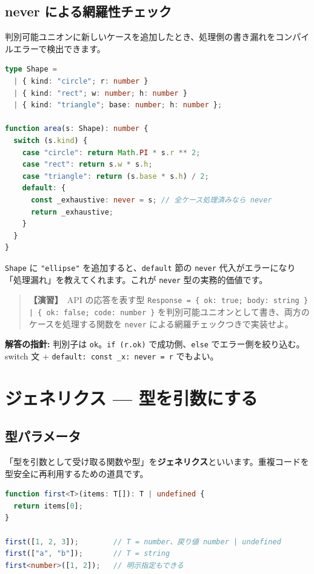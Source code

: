 \documentclass{article}
\begin{document}
\subsection{never による網羅性チェック}

判別可能ユニオンに新しいケースを追加したとき、処理側の書き漏れをコンパイルエラーで検出できます。

\begin{lstlisting}[language=TypeScript]
type Shape =
  | { kind: "circle"; r: number }
  | { kind: "rect"; w: number; h: number }
  | { kind: "triangle"; base: number; h: number };

function area(s: Shape): number {
  switch (s.kind) {
    case "circle": return Math.PI * s.r ** 2;
    case "rect": return s.w * s.h;
    case "triangle": return (s.base * s.h) / 2;
    default: {
      const _exhaustive: never = s; // 全ケース処理済みなら never
      return _exhaustive;
    }
  }
}
\end{lstlisting}

\texttt{Shape} に \texttt{"ellipse"} を追加すると、\texttt{default} 節の \texttt{never} 代入がエラーになり「処理漏れ」を教えてくれます。これが \texttt{never} 型の実務的価値です。

\begin{quote}
\textbf{【演習】}\ API の応答を表す型 \texttt{Response = \{ ok: true; body: string \} | \{ ok: false; code: number \}} を判別可能ユニオンとして書き、両方のケースを処理する関数を \texttt{never} による網羅チェックつきで実装せよ。
\end{quote}

\textbf{解答の指針:} 判別子は \texttt{ok}。\texttt{if (r.ok)} で成功側、\texttt{else} でエラー側を絞り込む。switch 文 + \texttt{default: const \_x: never = r} でもよい。

\section{ジェネリクス — 型を引数にする}

\subsection{型パラメータ}

「型を引数として受け取る関数や型」を\textbf{ジェネリクス}といいます。重複コードを型安全に再利用するための道具です。

\begin{lstlisting}[language=TypeScript]
function first<T>(items: T[]): T | undefined {
  return items[0];
}

first([1, 2, 3]);        // T = number、戻り値 number | undefined
first(["a", "b"]);       // T = string
first<number>([1, 2]);   // 明示指定もできる
\end{lstlisting}
\end{document}
